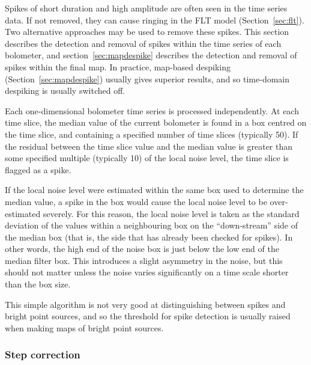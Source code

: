\documentclass[useAMS,usenatbib,nofootinbib]{mn2e}
\begin{document}
Spikes of short duration and high amplitude are often seen in the time
series data. If not removed, they can cause ringing in the FLT model
(Section~\ref{sec:flt}). Two alternative approaches may be used to
remove these spikes. This section describes the detection and removal
of spikes within the time series of each bolometer, and
section~\ref{sec:mapdespike} describes the detection and removal of
spikes within the final map. In practice, map-based despiking
(Section~\ref{sec:mapdespike}) usually gives superior results, and so
time-domain despiking is usually switched off.

Each one-dimensional bolometer time series is processed
independently. At each time slice, the median value of the current
bolometer is found in a box centred on the time slice, and containing
a specified number of time slices (typically 50). If the residual
between the time slice value and the median value is greater than some
specified multiple (typically 10) of the local noise level, the time
slice is flagged as a spike.

If the local noise level were estimated within the same box used to
determine the median value, a spike in the box would cause the local
noise level to be over-estimated severely. For this reason, the local
noise level is taken as the standard deviation of the values within a
neighbouring box on the ``down-stream'' side of the median box (that
is, the side that has already been checked for spikes). In other
words, the high end of the noise box is just below the low end of the
median filter box. This introduces a slight asymmetry in the noise,
but this should not matter unless the noise varies significantly on a
time scale shorter than the box size.

This simple algorithm is not very good at distinguishing between spikes
and bright point sources, and so the threshold for spike detection is
usually raised when making maps of bright point sources.

\subsubsection{Step correction}
\label{sec:steps}
\end{document}
